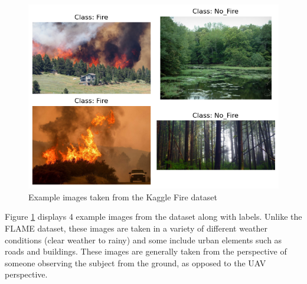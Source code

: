 \documentclass[a4paper,11pt]{article} %
\begin{document}
\begin{figure}[h]
    \centering
    \includegraphics{../figures/fire_dataset_example.png}
    \caption{Example images taken from the Kaggle Fire dataset}
    \label{fig:fire_example}
\end{figure}

Figure \ref{fig:fire_example} displays 4 example images from the dataset along with labels. Unlike the FLAME dataset, these images are taken
in a variety of different weather conditions (clear weather to rainy) and some include urban elements such as roads and buildings. These images are
generally taken from the perspective of someone observing the subject from the ground, as opposed to the UAV perspective.
\end{document}
